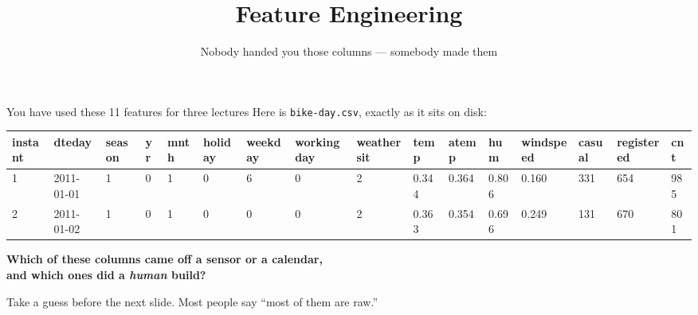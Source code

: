 \documentclass[aspectratio=169]{beamer}
\title{Feature Engineering}
\subtitle{Nobody handed you those columns --- somebody made them}
\date{}
\begin{document}
\begin{frame}{You have used these 11 features for three lectures}
  Here is \texttt{bike-day.csv}, exactly as it sits on disk:
  \vskip 4pt
  \begin{center}
    {\tiny\ttfamily
    \begin{tabular}{@{}l@{\;}l@{\;}l@{\;}l@{\;}l@{\;}l@{\;}l@{\;}l@{\;}l@{\;}l@{\;}l@{\;}l@{\;}l@{\;}l@{\;}l@{\;}l@{}}
      instant & dteday & season & yr & mnth & holiday & weekday & workingday & weathersit
        & temp & atemp & hum & windspeed & casual & registered & cnt \\
      \hline
      1 & 2011-01-01 & 1 & 0 & 1 & 0 & 6 & 0 & 2 & 0.344 & 0.364 & 0.806 & 0.160 & 331 & 654 & 985 \\
      2 & 2011-01-02 & 1 & 0 & 1 & 0 & 0 & 0 & 2 & 0.363 & 0.354 & 0.696 & 0.249 & 131 & 670 & 801 \\
    \end{tabular}}
  \end{center}
  \vfill
  \pause
  \begin{center}
    \textbf{\large Which of these columns came off a sensor or a calendar,}\\
    \textbf{\large and which ones did a \emph{human} build?}
  \end{center}
  \vfill
  \footnotesize Take a guess before the next slide. Most people say ``most of them are raw.''
\end{frame}
\end{document}
